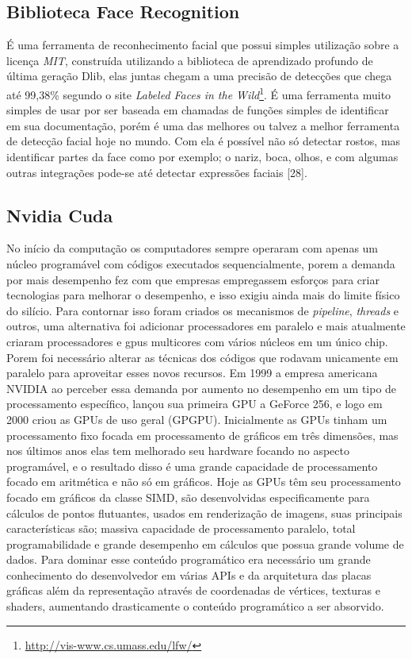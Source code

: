 \subsection{Biblioteca Face Recognition}
É uma ferramenta de reconhecimento facial que possui simples utilização sobre a licença \textit{MIT}, construída utilizando a biblioteca de aprendizado profundo de última geração Dlib, elas juntas chegam a uma precisão de detecções que chega até 99,38\% segundo o site \textit{Labeled Faces in the Wild}\footnote{\url{http://vis-www.cs.umass.edu/lfw/}}. É uma ferramenta muito simples de usar por ser baseada em chamadas de funções simples de identificar em sua documentação, porém é uma das melhores ou talvez a melhor ferramenta de detecção facial hoje no mundo.
Com ela é possível não só detectar rostos, mas identificar partes da face como por exemplo; o nariz, boca, olhos, e com algumas outras integrações pode-se até detectar expressões faciais [28].

\subsection{Nvidia Cuda}
No início da computação os computadores sempre operaram com apenas um núcleo programável com códigos executados sequencialmente, porem a demanda por mais desempenho fez com que empresas empregassem esforços para criar tecnologias para melhorar o desempenho, e isso exigiu ainda mais do limite físico do silício. Para contornar isso foram criados os mecanismos de \textit{pipeline}, \textit{threads} e outros, uma alternativa foi adicionar processadores em paralelo e mais atualmente criaram processadores e gpus multicores com vários núcleos em um único chip. Porem foi necessário alterar as técnicas dos códigos que rodavam unicamente em paralelo para aproveitar esses novos recursos.
Em 1999 a empresa americana NVIDIA ao perceber essa demanda por aumento no desempenho em um tipo de processamento específico, lançou sua primeira GPU a GeForce 256, e logo em 2000 criou as GPUs de uso geral (GPGPU).
Inicialmente as GPUs tinham um processamento fixo focada em processamento de gráficos em três dimensões, mas nos últimos anos elas tem melhorado seu hardware focando no aspecto programável, e o resultado disso é uma grande capacidade de processamento focado em aritmética e não só em gráficos.
Hoje as GPUs têm seu processamento focado em gráficos da classe SIMD, são desenvolvidas especificamente para cálculos de pontos flutuantes, usados em renderização de imagens, suas principais características são; massiva capacidade de processamento paralelo, total programabilidade e grande desempenho em cálculos que possua grande volume de dados. Para dominar esse conteúdo programático era necessário um grande conhecimento do desenvolvedor em várias APIs e da arquitetura das placas gráficas além da representação através de coordenadas de vértices, texturas e shaders, aumentando drasticamente o conteúdo programático a ser absorvido.

